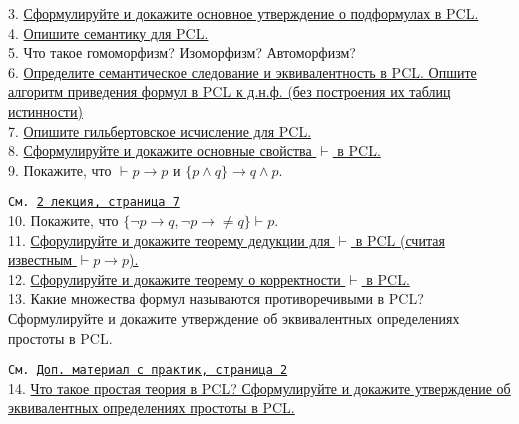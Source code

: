 \documentclass[a4paper,100pt]{article}
\theoremstyle{indented}
\theoremstyle{definition}
\theoremstyle{remark}
\DeclareMathOperator{\ra}{\rightarrow}
\begin{document}
3. \hyperlink{b3}{Сформулируйте и докажите основное утверждение о подформулах в PCL.} \\

4. \hyperlink{b4}{Опишите семантику для PCL.} \\

5. %
{Что такое гомоморфизм? Изоморфизм? Автоморфизм?} \\

6. \hyperlink{b6}{Определите семантическое следование и эквивалентность в PCL. Опшите алгоритм приведения формул в PCL к д.н.ф. (без построения их таблиц истинности)} \\ 

7. \hyperlink{b7}{Опишите гильбертовское исчисление для PCL.} \\

8. \hyperlink{b8}{Сформулируйте и докажите основные свойства $\vdash$ в PCL.} \\

9. %
{Покажите, что $\vdash p \ra p$ и $\{p\wedge q\}\ra q \wedge p$.} \

\texttt{См. \href{http://www.mi-ras.ru/~speranski/courses/logic-1-2021-spring/slides_2.pdf}{2 лекция, страница 7}}\\

10. %
{Покажите, что $\{\neg p \ra q, \neg p \ra \neq q\} \vdash p$.} \\

11. \hyperlink{b11}{Сфорулируйте и докажите теорему дедукции для $\vdash$ в PCL (считая известным $\vdash p \ra p$).} \\

12. \hyperlink{b12}{Сфорулируйте и докажите теорему о корректности $\vdash$ в PCL.} \\

13. %
{Какие множества формул называются противоречивыми в PCL? Сформулируйте и докажите утверждение об эквивалентных определениях простоты в PCL.} \

\texttt{См. \href{http://www.mi-ras.ru/~speranski/courses/logic-1-2021-spring/slides-more_pcl.pdf}{Доп. материал с практик, страница 2}} \\

14. \hyperlink{b14}{Что такое простая теория в PCL? Сформулируйте и докажите утверждение об эквивалентных определениях простоты в PCL.} \\
\end{document}
